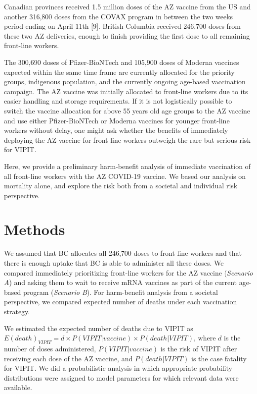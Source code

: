 \documentclass[]{elsarticle} %
\begin{document}
Canadian provinces received 1.5 million doses of the AZ vaccine from the
US and another 316,800 doses from the COVAX program in between the two
weeks period ending on April 11th {[}9{]}. British Columbia received
246,700 doses from these two AZ deliveries, enough to finish providing
the first dose to all remaining front-line workers.

The 300,690 doses of Pfizer-BioNTech and 105,900 doses of Moderna
vaccines expected within the same time frame are currently allocated for
the priority groups, indigenous population, and the currently ongoing
age-based vaccination campaign. The AZ vaccine was initially allocated
to front-line workers due to its easier handling and storage
requirements. If it is not logistically possible to switch the vaccine
allocation for above 55 years old age groups to the AZ vaccine and use
either Pfizer-BioNTech or Moderna vaccines for younger front-line
workers without delay, one might ask whether the benefits of immediately
deploying the AZ vaccine for front-line workers outweigh the rare but
serious risk for VIPIT.

Here, we provide a preliminary harm-benefit analysis of immediate
vaccination of all front-line workers with the AZ COVID-19 vaccine. We
based our analysis on mortality alone, and explore the risk both from a
societal and individual risk perspective.

\hypertarget{methods}{%
\section{Methods}\label{methods}}

We assumed that BC allocates all 246,700 doses to front-line workers and
that there is enough uptake that BC is able to administer all these
doses. We compared immediately prioritizing front-line workers for the
AZ vaccine (\emph{Scenario A}) and asking them to wait to receive mRNA
vaccines as part of the current age-based program (\emph{Scenario B}).
For harm-benefit analysis from a societal perspective, we compared
expected number of deaths under each vaccination strategy.

We estimated the expected number of deaths due to VIPIT as
\(E(death)_{VIPIT} = d \times P(VIPIT|vaccine) \times P(death|VIPIT)\),
where \(d\) is the number of doses administered, \(P(VIPIT|vaccine)\) is
the risk of VIPIT after receiving each dose of the AZ vaccine, and
\(P(death|VIPIT)\) is the case fatality for VIPIT. We did a
probabilistic analysis in which appropriate probability distributions
were assigned to model parameters for which relevant data were
available.
\end{document}
